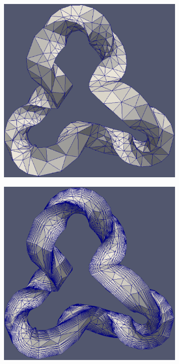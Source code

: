 \documentclass[conf]{new-aiaa}
\begin{document}
\begin{figure}[hbt!]
\centering
\begin{subfigure}{.5\textwidth}
  \centering
  \includegraphics[width=.9\linewidth]{twist/before.eps}
  \caption{}
  \label{twist1}
\end{subfigure}%
\begin{subfigure}{.5\textwidth}
  \centering
  \includegraphics[width=.9\linewidth]{twist/after.eps}

\end{subfigure}
\end{figure}
\end{document}
